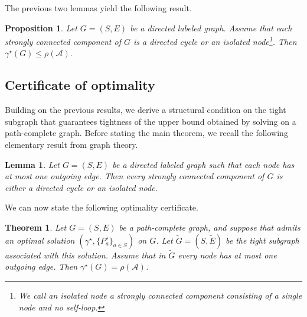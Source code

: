 \documentclass[letterpaper, 10 pt, conference]{ieeeconf}  %
\newtheorem{theorem}{Theorem}
\newtheorem{lemma}{Lemma}
\newtheorem{proposition}{Proposition}
\newif\ifextended
\begin{document}
The previous two lemmas yield the following result.
\begin{proposition}
\label{prop:gamma_opt_when_cycle}
Let $G=(S,E)$ be a directed labeled graph. Assume that each strongly connected component of $G$ is a directed cycle or an isolated node\footnote{We call an \emph{isolated node} a strongly connected component consisting of a
single node and no self-loop.}. Then \(
\gamma^\star (G) \le \rho(\mathcal A).
\)
\end{proposition}
\ifextended
\begin{proof}
Let $\mathcal S(G)$ be the set of strongly connected components of $G$.
By \Cref{lemma:strongly_connected_comp}, there exists $C \in \mathcal S(G)$ such that
$\gamma^\star (G)=\gamma^\star (G_C)$.

If $C$ is a directed cycle, \Cref{lemma:lb_on_cycle} gives
$\gamma^\star (G_C) \le \rho(\mathcal A)$.
If $C$ is an isolated node, then $G_C$ has no edge and thus
$\gamma^\star (G_C)=0 \le \rho(\mathcal A)$, concluding the proof.
\end{proof}
\fi
\subsection{Certificate of optimality}\label{sec:opti_certificate}
Building on the previous results, we derive a structural condition on the
tight subgraph that guarantees tightness of the upper bound obtained by solving
 on a path-complete graph. Before stating the main
theorem, we recall the following elementary result from graph theory.
\begin{lemma}\label{lemma: outgoing_edges_cycle}
Let $G=(S,E)$ be a directed labeled graph such that each node has at most one outgoing edge.
Then every strongly connected component of $G$ is either a directed cycle or an isolated node.
\end{lemma}
\ifextended
\begin{proof}
The proof is given in Appendix~\ref{appendix: proof_outgoing_edges_cycle}.
\end{proof}
\fi
 We can now state the following optimality certificate.
\begin{theorem}\label{thm:certificate_opt}
Let $G=(S,E)$ be a path-complete graph, and suppose that  admits an optimal solution $(\gamma^\star ,\{P_a^\star \}_{a\in S})$ on $G$. Let $\tilde G=(S,\tilde E)$ be the tight subgraph associated with this solution. Assume that in $\tilde G$ every node has at
most one outgoing edge. Then $\gamma^\star (G)=\rho(\mathcal A)$.
\end{theorem}
\ifextended
\begin{proof}
By \Cref{lemma: outgoing_edges_cycle}, each strongly connected component
of $\tilde G$ is either an isolated node or a directed cycle.
Hence, by \Cref{prop:gamma_opt_when_cycle} applied on $\tilde G$,
\(
\gamma^\star (\tilde G)\le \rho(\mathcal A).
\)
Since $\gamma^\star (G)=\gamma^\star (\tilde G)$ by \Cref{prop:opt_tight}, and
$\gamma^\star (G)\ge \rho(\mathcal A)$ by \Cref{thm:ub_jsr},
the result follows.
\end{proof}
\fi
\end{document}
